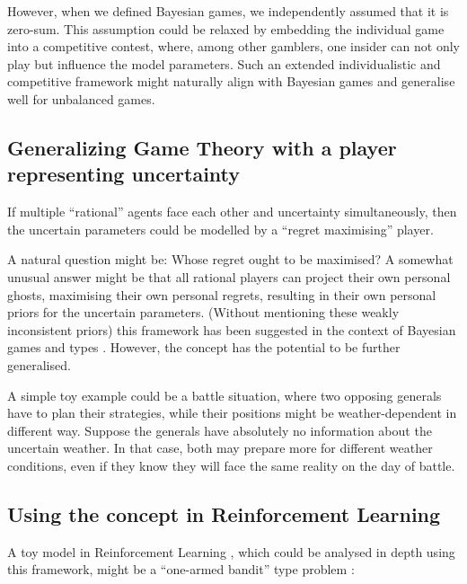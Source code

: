 \documentclass{article}
\theoremstyle{definition}
\begin{document}
However, when we defined Bayesian games, we independently assumed that it is zero-sum.
This assumption could be relaxed by embedding the individual game into a competitive contest, where, among other gamblers, one insider can not only play but influence the model parameters.
Such an extended individualistic and competitive framework might naturally align with Bayesian games and generalise well for unbalanced games.

\subsection{Generalizing Game Theory with a player representing uncertainty}

If multiple ``rational'' agents face each other and uncertainty simultaneously, then the uncertain parameters could be modelled by a ``regret maximising'' player.

A natural question might be: Whose regret ought to be maximised? A somewhat unusual answer might be that all rational players can project their own personal ghosts, maximising their own personal regrets, resulting in their own personal priors for the uncertain parameters.
(Without mentioning these weakly inconsistent priors) this framework has been suggested in the context of Bayesian games and types \cite{arxiv:GameTheoryRegret,paper:GameTheoryRegret}. However, the concept has the potential to be further generalised.

A simple toy example could be a battle situation, where two opposing generals have to plan their strategies, while their positions might be weather-dependent in different way. Suppose the generals have absolutely no information about the uncertain weather. In that case, both may prepare more for different weather conditions, even if they know they will face the same reality on the day of battle.

\subsection{Using the concept in Reinforcement Learning}

A toy model in Reinforcement Learning \cite{book:RL}, which could be analysed in depth using this framework, might be a ``one-armed bandit'' type problem \cite{book:BanditBook}:
\end{document}
